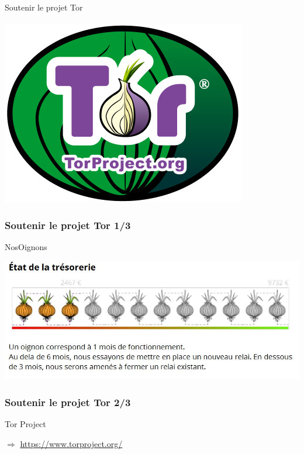 \documentclass{beamer}
\begin{document}
\begin{frame}
\begin{center}
\Huge{Soutenir le projet Tor}
\\~\\ \includegraphics[scale=0.4]{./images/logo_tor.jpg}
\end{center}
\end{frame}
\begin{frame}
\frametitle{Soutenir le projet Tor 1/3}

\begin{block}{NosOignons}
\begin{center}
\includegraphics[scale=0.6]{./images/Dons_nos_oignons.jpg}
\end{center}
\end{block}
 \end{frame}
\begin{frame}
\frametitle{Soutenir le projet Tor 2/3}
\begin{block}{Tor Project}
\begin{itemize}
\end{itemize}
$\Rightarrow$  \url{https://www.torproject.org/}
\end{block}
 \end{frame}
\end{document}
